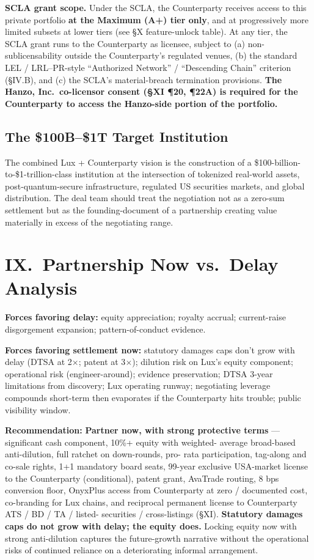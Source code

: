 \documentclass[11pt,letterpaper]{article}
\begin{document}
\textbf{SCLA grant scope.} Under the SCLA, the Counterparty
receives access to this private portfolio \textbf{at the Maximum
(A+) tier only}, and at progressively more limited subsets at
lower tiers (see \S X feature-unlock table). At any tier, the
SCLA grant runs to the Counterparty as licensee, subject to (a)
non-sublicensability outside the Counterparty's regulated venues,
(b) the standard LEL / LRL--PR-style ``Authorized Network'' /
``Descending Chain'' criterion (\S IV.B), and (c) the SCLA's
material-breach termination provisions. \textbf{The Hanzo, Inc.\
co-licensor consent (\S XI ¶20, ¶22A) is required for the
Counterparty to access the Hanzo-side portion of the portfolio.}

\subsection*{The \$100B--\$1T Target Institution}

The combined Lux + Counterparty vision is the construction of a
\$100-billion-to-\$1-trillion-class institution at the intersection
of tokenized real-world assets, post-quantum-secure infrastructure,
regulated US securities markets, and global distribution. The deal
team should treat the negotiation not as a zero-sum settlement but
as the founding-document of a partnership creating value materially
in excess of the negotiating range.

\section*{IX.\ Partnership Now vs.\ Delay Analysis}

\textbf{Forces favoring delay:} equity appreciation; royalty accrual;
current-raise disgorgement expansion; pattern-of-conduct evidence.

\textbf{Forces favoring settlement now:} statutory damages caps don't
grow with delay (DTSA at 2$\times$; patent at 3$\times$); dilution risk
on Lux's equity component; operational risk (engineer-around); evidence
preservation; DTSA 3-year limitations from discovery; Lux operating
runway; negotiating leverage compounds short-term then evaporates if
the Counterparty hits trouble; public visibility window.

\textbf{Recommendation:} \textbf{Partner now, with strong protective
terms} --- significant cash component, 10\%+ equity with weighted-
average broad-based anti-dilution, full ratchet on down-rounds, pro-
rata participation, tag-along and co-sale rights, 1+1 mandatory board
seats, 99-year exclusive USA-market license to the Counterparty
(conditional), patent grant, AvaTrade routing, 8 bps conversion floor,
OnyxPlus access from Counterparty at zero / documented cost, co-branding for Lux chains, and
reciprocal permanent license to Counterparty ATS / BD / TA / listed-
securities / cross-listings (\S XI). \textbf{Statutory damages caps
do not grow with delay; the equity does.} Locking equity now with
strong anti-dilution captures the future-growth narrative without
the operational risks of continued reliance on a deteriorating
informal arrangement.
\end{document}
